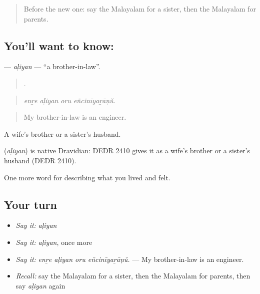 \label{lesson:ML-C554-aliyan}



\begin{quote}
Before the new one: say the Malayalam for a sister, then the Malayalam for parents.
\end{quote}

\subsection*{You'll want to know: }
\textbf{} — \emph{aḷiyan} — \textquotedblleft{}a brother-in-law\textquotedblright{}.

\begin{quote}
   .
\end{quote}

\begin{quote}
\emph{enṟe aḷiyan oru eñcinīyaṟāṇŭ.}
\end{quote}

\begin{quote}
My brother-in-law is an engineer.
\end{quote}

A wife's brother or a sister's husband.

\begin{cousinweb}
\textbf{} (\emph{aḷiyan}) is native Dravidian: DEDR 2410 gives it as a wife's brother or a sister's husband (DEDR 2410).
\end{cousinweb}

\begin{grammarlens}[title={What you've built}]
One more word for describing what you lived and felt.
\end{grammarlens}

\subsection*{Your turn}
\begin{itemize}
\raggedright
  \item \emph{Say it:} \emph{aḷiyan}
  \item \emph{Say it:} \emph{aḷiyan}, once more
  \item \emph{Say it:} \emph{enṟe aḷiyan oru eñcinīyaṟāṇŭ.} — My brother-in-law is an engineer.
  \item \emph{Recall:} say the Malayalam for a sister, then the Malayalam for parents, then say \emph{aḷiyan} again
\end{itemize}

